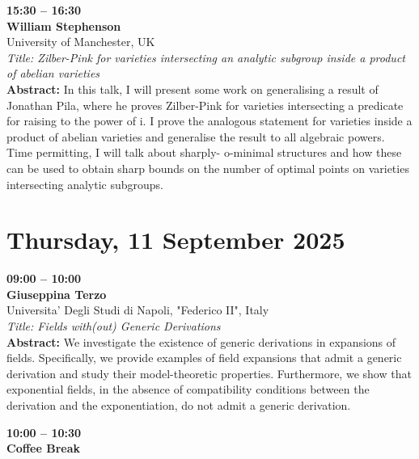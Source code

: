 \documentclass[10pt,a4paper]{article}
\begin{document}
\begin{tcolorbox}[talkbox]
\textbf{15:30 -- 16:30} \\
\textbf{William Stephenson} \\
University of Manchester, UK \\
\textit{Title: Zilber-Pink for varieties intersecting an analytic subgroup inside a product of abelian varieties} \\
\textbf{Abstract:} In this talk, I will present some work on generalising a result of Jonathan Pila, where he proves Zilber-Pink for varieties intersecting a predicate for raising to the power of i. I prove the analogous statement for varieties inside a product of abelian varieties and generalise the result to all algebraic powers. Time permitting, I will talk about sharply- o-minimal structures and how these can be used to obtain sharp bounds on the number of optimal points on varieties intersecting analytic subgroups.
\end{tcolorbox}

\newpage

\section{Thursday, 11 September 2025}

\begin{tcolorbox}[talkbox]
\textbf{09:00 -- 10:00} \\
\textbf{Giuseppina Terzo} \\
Universita' Degli Studi di Napoli, "Federico II", Italy \\
\textit{Title: Fields with(out) Generic Derivations} \\
\textbf{Abstract:} We investigate the existence of generic derivations in expansions of fields. Specifically, we provide examples of field expansions that admit a generic derivation and study their model-theoretic properties. Furthermore, we show that exponential fields, in the absence of compatibility conditions between the derivation and the exponentiation, do not admit a generic derivation.
\end{tcolorbox}

\begin{tcolorbox}[talkbox]
\textbf{10:00 -- 10:30} \\
\textbf{Coffee Break}
\end{tcolorbox}
\end{document}
